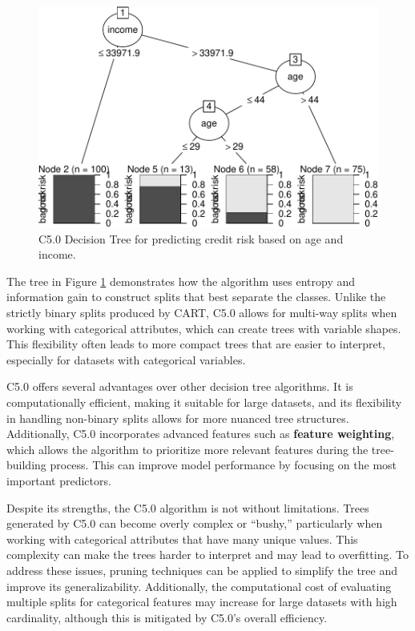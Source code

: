 \documentclass[
]{book}
\theoremstyle{definition}
\theoremstyle{definition}
\theoremstyle{definition}
\theoremstyle{definition}
\theoremstyle{remark}
\begin{document}
\begin{figure}

{\centering \includegraphics[width=0.65\linewidth]{tree_files/figure-latex/tree-C50-1} 

}

\caption{C5.0 Decision Tree for predicting credit risk based on age and income.}\label{fig:tree-C50}
\end{figure}

The tree in Figure \ref{fig:tree-C50} demonstrates how the algorithm uses entropy and information gain to construct splits that best separate the classes. Unlike the strictly binary splits produced by CART, C5.0 allows for multi-way splits when working with categorical attributes, which can create trees with variable shapes. This flexibility often leads to more compact trees that are easier to interpret, especially for datasets with categorical variables.

C5.0 offers several advantages over other decision tree algorithms. It is computationally efficient, making it suitable for large datasets, and its flexibility in handling non-binary splits allows for more nuanced tree structures. Additionally, C5.0 incorporates advanced features such as \textbf{feature weighting}, which allows the algorithm to prioritize more relevant features during the tree-building process. This can improve model performance by focusing on the most important predictors.

Despite its strengths, the C5.0 algorithm is not without limitations. Trees generated by C5.0 can become overly complex or ``bushy,'' particularly when working with categorical attributes that have many unique values. This complexity can make the trees harder to interpret and may lead to overfitting. To address these issues, pruning techniques can be applied to simplify the tree and improve its generalizability. Additionally, the computational cost of evaluating multiple splits for categorical features may increase for large datasets with high cardinality, although this is mitigated by C5.0's overall efficiency.
\end{document}
